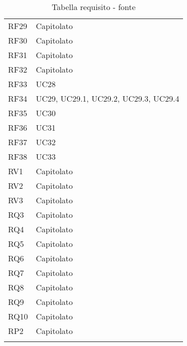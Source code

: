 {\begin{longtable}{C{.47\freewidth} C{.47\freewidth}}
      RF29 & Capitolato\\
      RF30 & Capitolato\\
      RF31 & Capitolato\\
      RF32 & Capitolato\\
      RF33 & UC28\\
      RF34 & UC29, UC29.1, UC29.2, UC29.3, UC29.4\\
      RF35 & UC30\\
      RF36 & UC31\\
      RF37 &UC32\\
      RF38 &UC33\\
      RV1 & Capitolato\\
      RV2 & Capitolato\\
      RV3 & Capitolato\\

      RQ3 & Capitolato\\
      RQ4 & Capitolato\\
      RQ5 & Capitolato\\
      RQ6 & Capitolato\\
      RQ7 & Capitolato\\
      RQ8 & Capitolato\\
      RQ9 & Capitolato\\
      RQ10 & Capitolato\\

      RP2 & Capitolato\\
      \bottomrule
      \caption{Tabella requisito - fonte}
      \end{longtable}
}
